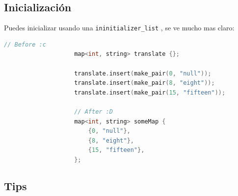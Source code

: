 \documentclass[12pt, fleqn]{report}                             %
\theoremstyle{break}                                            %
\newcommand{\textCode}[1]  { \texttt{#1} }                      %
\begin{document}
            \subsection{Inicialización}

                Puedes inicializar usando una \textCode{ininitializer\_list}, se ve mucho mas claro:
                \begin{lstlisting}[language=C++, gobble=20]
                    // Before :c
                    map<int, string> translate {};

                    translate.insert(make_pair(0, "null"));
                    translate.insert(make_pair(8, "eight"));
                    translate.insert(make_pair(15, "fifteen"));
                    
                    // After :D
                    map<int, string> someMap {
                        {0, "null"},
                        {8, "eight"},
                        {15, "fifteen"},
                    };

                \end{lstlisting}

            \subsection{Tips}
\end{document}
